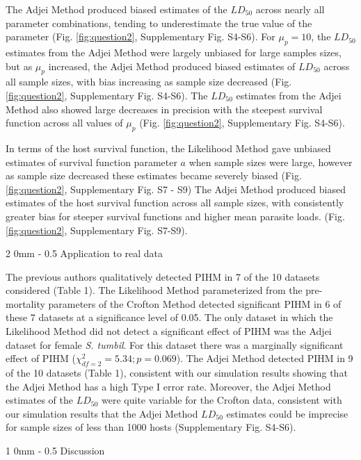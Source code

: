 \documentclass[12pt, a4paper]{article}
\makeatletter
\renewcommand{\section}{\@startsection
{section}%
{1}%
{0mm}%
{-\baselineskip}%
{0.5\baselineskip}%
{\normalfont\bf\large}} %
\renewcommand{\subsection}{\@startsection
{subsection}%
{2}%
{0mm}%
{-\baselineskip}%
{0.5\baselineskip}%
{\normalfont\bf}} %
\makeatother
\begin{document}
The Adjei Method produced biased estimates of the $LD_{50}$ across nearly all parameter combinations, tending to underestimate the true value of the parameter (Fig. \ref{fig:question2}, Supplementary Fig. S4-S6).  For $\mu_p = 10$, the $LD_{50}$
estimates from the Adjei Method were largely unbiased for large samples sizes, but as $\mu_p$ increased, the Adjei Method
produced biased estimates of $LD_{50}$ across all sample sizes, with bias
increasing as sample size decreased (Fig. \ref{fig:question2}, Supplementary Fig. S4-S6). The $LD_{50}$ estimates from the Adjei
Method also showed large decreases in precision with the steepest survival function across all values of $\mu_p$ (Fig. \ref{fig:question2}, Supplementary Fig. S4-S6).

In terms of the host survival function, the Likelihood Method gave unbiased estimates of survival function parameter $a$ when sample sizes were large, however as sample size decreased these estimates became severely biased (Fig. \ref{fig:question2}, Supplementary Fig. S7 - S9) The Adjei Method produced
biased estimates of the host survival function across all sample sizes, with consistently greater bias for steeper survival functions and higher mean parasite loads. (Fig. \ref{fig:question2}, Supplementary Fig. S7-S9).

\subsection{Application to real data}

The previous authors qualitatively detected PIHM
in 7 of the 10 datasets considered (Table 1).  The Likelihood Method parameterized
from the pre-mortality parameters of the Crofton Method detected significant
PIHM in 6 of these 7 datasets at a significance level of 0.05.  The only
dataset in which the Likelihood Method did not detect a significant effect of PIHM was the Adjei dataset
for female \emph{S. tumbil}.  For this dataset there was a marginally significant effect
of PIHM ($\chi^2_{df=2} = 5.34; p = 0.069$). The Adjei Method detected PIHM in 9 of the 10 datasets (Table 1), consistent with our simulation results showing that the Adjei Method has a high Type I error rate.  Moreover, the Adjei Method estimates of the $LD_{50}$ were quite variable for the Crofton data, consistent with our simulation results that the Adjei Method $LD_{50}$ estimates could be imprecise for sample sizes of less than 1000 hosts (Supplementary Fig. S4-S6).

\section{Discussion}
\end{document}
